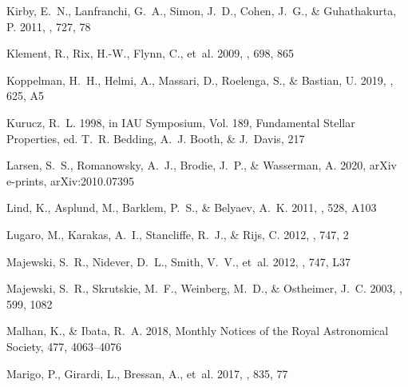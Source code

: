 \documentclass[twocolumn]{aastex63}
\begin{document}
\begin{thebibliography}{}
{Kirby}, E.~N., {Lanfranchi}, G.~A., {Simon}, J.~D., {Cohen}, J.~G., \&
  {Guhathakurta}, P. 2011, \apj, 727, 78

{Klement}, R., {Rix}, H.-W., {Flynn}, C., {et~al.} 2009, \apj, 698, 865

{Koppelman}, H.~H., {Helmi}, A., {Massari}, D., {Roelenga}, S., \& {Bastian},
  U. 2019, \aap, 625, A5

{Kurucz}, R.~L. 1998, in IAU Symposium, Vol. 189, Fundamental Stellar
  Properties, ed. T.~R. {Bedding}, A.~J. {Booth}, \& J.~{Davis}, 217

{Larsen}, S.~S., {Romanowsky}, A.~J., {Brodie}, J.~P., \& {Wasserman}, A. 2020,
  arXiv e-prints, arXiv:2010.07395

{Lind}, K., {Asplund}, M., {Barklem}, P.~S., \& {Belyaev}, A.~K. 2011, \aap,
  528, A103

{Lugaro}, M., {Karakas}, A.~I., {Stancliffe}, R.~J., \& {Rijs}, C. 2012, \apj,
  747, 2

{Majewski}, S.~R., {Nidever}, D.~L., {Smith}, V.~V., {et~al.} 2012, \apjl, 747,
  L37

{Majewski}, S.~R., {Skrutskie}, M.~F., {Weinberg}, M.~D., \& {Ostheimer}, J.~C.
  2003, \apj, 599, 1082

Malhan, K., \& Ibata, R.~A. 2018, Monthly Notices of the Royal Astronomical
  Society, 477, 4063–4076

{Marigo}, P., {Girardi}, L., {Bressan}, A., {et~al.} 2017, \apj, 835, 77


\end{thebibliography}
\end{document}

